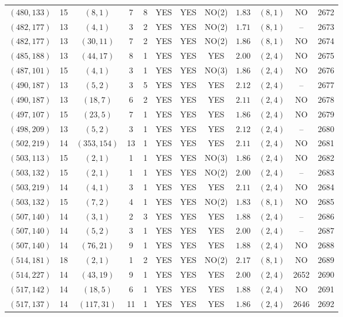 \begin{longtable}{|c|c|c|c|c|c|c|c|c|c|c|c|}
$(480,133)$ & 15 & $(8,1)$ & 7 & 8 & YES & YES & NO(2) & $1.83$ & $(8,1)$ & NO & 2672\\
$(482,177)$ & 13 & $(4,1)$ & 3 & 2 & YES & YES & NO(2) & $1.71$ & $(8,1)$ & -- & 2673\\
$(482,177)$ & 13 & $(30,11)$ & 7 & 2 & YES & YES & NO(2) & $1.86$ & $(8,1)$ & NO & 2674\\
$(485,188)$ & 13 & $(44,17)$ & 8 & 1 & YES & YES & YES & $2.00$ & $(2,4)$ & NO & 2675\\
$(487,101)$ & 15 & $(4,1)$ & 3 & 1 & YES & YES & NO(3) & $1.86$ & $(2,4)$ & NO & 2676\\
$(490,187)$ & 13 & $(5,2)$ & 3 & 5 & YES & YES & YES & $2.12$ & $(2,4)$ & -- & 2677\\
$(490,187)$ & 13 & $(18,7)$ & 6 & 2 & YES & YES & YES & $2.11$ & $(2,4)$ & NO & 2678\\
$(497,107)$ & 15 & $(23,5)$ & 7 & 1 & YES & YES & YES & $1.86$ & $(2,4)$ & NO & 2679\\
$(498,209)$ & 13 & $(5,2)$ & 3 & 1 & YES & YES & YES & $2.12$ & $(2,4)$ & -- & 2680\\
$(502,219)$ & 14 & $(353,154)$ & 13 & 1 & YES & YES & YES & $2.11$ & $(2,4)$ & NO & 2681\\
$(503,113)$ & 15 & $(2,1)$ & 1 & 1 & YES & YES & NO(3) & $1.86$ & $(2,4)$ & NO & 2682\\
$(503,132)$ & 15 & $(2,1)$ & 1 & 1 & YES & YES & NO(2) & $2.00$ & $(2,4)$ & -- & 2683\\
$(503,219)$ & 14 & $(4,1)$ & 3 & 1 & YES & YES & YES & $2.11$ & $(2,4)$ & NO & 2684\\
$(503,132)$ & 15 & $(7,2)$ & 4 & 1 & YES & YES & NO(2) & $1.83$ & $(8,1)$ & NO & 2685\\
$(507,140)$ & 14 & $(3,1)$ & 2 & 3 & YES & YES & YES & $1.88$ & $(2,4)$ & -- & 2686\\
$(507,140)$ & 14 & $(5,2)$ & 3 & 1 & YES & YES & YES & $2.00$ & $(2,4)$ & -- & 2687\\
$(507,140)$ & 14 & $(76,21)$ & 9 & 1 & YES & YES & YES & $1.88$ & $(2,4)$ & NO & 2688\\
$(514,181)$ & 18 & $(2,1)$ & 1 & 2 & YES & YES & NO(2) & $2.17$ & $(8,1)$ & NO & 2689\\
$(514,227)$ & 14 & $(43,19)$ & 9 & 1 & YES & YES & YES & $2.00$ & $(2,4)$ & 2652 & 2690\\
$(517,142)$ & 14 & $(18,5)$ & 6 & 1 & YES & YES & YES & $1.88$ & $(2,4)$ & NO & 2691\\
$(517,137)$ & 14 & $(117,31)$ & 11 & 1 & YES & YES & YES & $1.86$ & $(2,4)$ & 2646 & 2692\\

\end{longtable}
